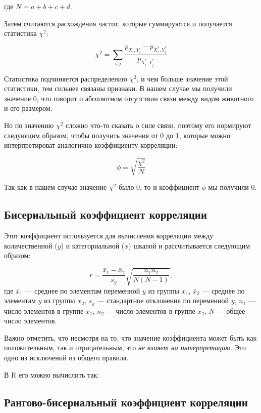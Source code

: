 \documentclass[
  letterpaper,
]{scrbook}
\theoremstyle{definition}
\theoremstyle{remark}
\begin{document}
где \(N = a + b + c + d\).

Затем считаются расхождения частот, которые суммируются и получается
статистика \(\chi^2\):

\[
\chi^2 = \sum_{i,j} \frac{p_{X_i,Y_j} - p_{X_i^*,Y_j^*}}{p_{X_i^*,Y_j^*}}
\]

Статистика подчиняется распределению \(\chi^2\), и чем больше значение
этой статистики, тем сильнее связаны признаки. В нашем случае мы
получили значение 0, что говорит о абсолютном отсутствии связи между
видом животного и его размером.

Но по значению \(\chi^2\) сложно что-то сказать о силе связи, поэтому
его нормируют следующим образом, чтобы получить значения от 0 до 1,
которые можно интерпретироват аналогично коэффициенту корреляции:

\[
\phi = \sqrt{\frac{\chi^2}{N}}
\]

Так как в нашем случае значение \(\chi^2\) было 0, то и коэффициент
\(\phi\) мы получили 0.

\subsection{Бисериальный коэффициент
корреляции}\label{ux431ux438ux441ux435ux440ux438ux430ux43bux44cux43dux44bux439-ux43aux43eux44dux444ux444ux438ux446ux438ux435ux43dux442-ux43aux43eux440ux440ux435ux43bux44fux446ux438ux438}

Этот коэффициент используется для вычисления корреляции между
количественной (\(y\)) и категориальной (\(x\)) шкалой и рассчитывается
следующим образом:

\[
r = \frac{\bar x_1 - \bar x_2}{s_y} \sqrt{\frac{n_1 n_2}{N(N-1)}},
\] где \(\bar x_1\) --- среднее по элементам переменной \(y\) из группы
\(x_1\), \(\bar x_2\) --- среднее по элементам \(y\) из группы \(x_2\),
\(s_y\) --- стандартное отклонение по переменной \(y\), \(n_1\) ---
число элементов в группе \(x_1\), \(n_2\) --- число элементов в группе
\(x_2\), \(N\) --- общее число элементов.

Важно отметить, что несмотря на то, что значение коэффициента может быть
как положительным, так и отрицательным, это \emph{не влияет на
интерпретацию}. Это одно из исключений из общего правила.

В R его можно вычислить так:

\subsection{Рангово-бисериальный коэффициент
корреляции}\label{ux440ux430ux43dux433ux43eux432ux43e-ux431ux438ux441ux435ux440ux438ux430ux43bux44cux43dux44bux439-ux43aux43eux44dux444ux444ux438ux446ux438ux435ux43dux442-ux43aux43eux440ux440ux435ux43bux44fux446ux438ux438}
\end{document}
